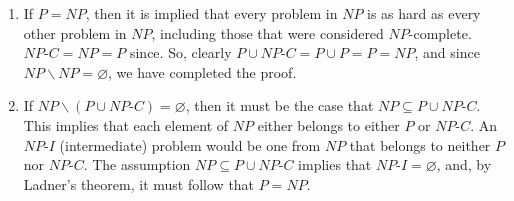 \documentclass{article}
\begin{document}
\begin{solution}
\begin{enumerate}[label = (\alph*)]
    \item If $P = NP$, then it is implied that every problem in $NP$ is as hard as every other problem in $NP$, including those that were considered $NP$-complete. $NP\text{-}C = NP = P$ since. So, clearly $P \cup NP\text{-}C = P  \cup P = P = NP$, and since $NP \backslash NP = \varnothing$, we have completed the proof.

\item If $NP \backslash (P \cup NP\text{-}C) = \varnothing$, then it must be the case that $NP \subseteq P \cup NP\text{-}C$. This implies that each element of $NP$ either belongs to either $P$ or $NP\text{-}C$. An $NP\text{-}I$ (intermediate) problem would be one from $NP$ that belongs to neither $P$ nor $NP\text{-}C$. The assumption $NP \subseteq P \cup NP\text{-}C$ implies that $NP\text{-}I = \varnothing$, and, by Ladner's theorem, it must follow that $P = NP$.
\end{enumerate}
\end{solution}
\end{document}

